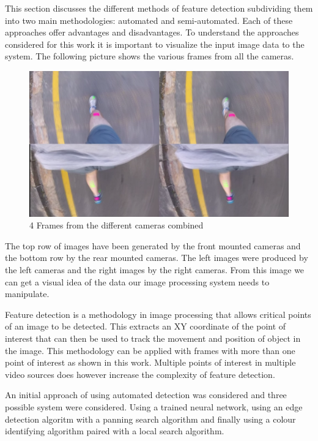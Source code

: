 This section discusses the different methods of feature detection subdividing them into two main methodologies: automated and semi-automated. Each of these approaches offer advantages and disadvantages. To understand the approaches considered for this work it is important to visualize the input image data to the system. The following picture shows the various frames from all the cameras.

\begin{figure}[!ht]
  \includegraphics[width=\linewidth]{figures/pat_run_quad.png}
  \caption{4 Frames from the different cameras combined}
  \label{fig:pat_run_quad}
\end{figure}

The top row of images have been generated by the front mounted cameras and the bottom row by the rear mounted cameras. The left images were produced by the left cameras and the right images by the right cameras. From this image we can get a visual idea of the data our image processing system needs to manipulate.

Feature detection is a methodology in image processing that allows critical points of an image to be detected. This extracts an XY coordinate of the point of interest that can then be used to track the movement and position of object in the image. This methodology can be applied with frames with more than one point of interest as shown in this work. Multiple points of interest in multiple video sources does however increase the complexity of feature detection.

An initial approach of using automated detection was considered and three possible system were considered. Using a trained neural network, using an edge detection algoritm with a panning search algorithm and finally using a colour identifying algorithm paired with a local search algorithm.

